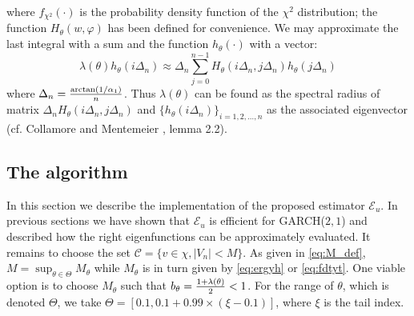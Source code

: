 where $f_{\chi^2}(\cdot)$ is the probability density function of the
$\chi^2$ distribution; the function $H_\theta(w, \varphi)$ has been defined
for convenience.
We may approximate the last integral with a sum and the function
$h_\theta(\cdot)$ with a vector:
\[
\lambda(\theta) h_\theta(i \Delta_n)
\approx
\Delta_n \sum_{j=0}^{n-1} H_\theta(i \Delta_n, j \Delta_n) h_\theta(j \Delta_n)
\]
where $\Delta_n = {\arctan(1/\alpha_1) \over n}$.
Thus $\lambda(\theta)$ can be found as the spectral radius of 
matrix $\Delta_n H_\theta(i \Delta_n, j \Delta_n)$ and 
$\{h_\theta(i \Delta_n)\}_ {i=1,2,\dots, n}$ as the associated
eigenvector (cf. Collamore and Mentemeier
\cite{collamore:mentemeier:2016}, lemma 2.2).

\subsection{The algorithm} \label{sec:main_algorithm}
In this section we describe the implementation of the proposed
estimator $\mathcal E_u$. In previous sections we have shown that
$\mathcal E_u$ is efficient for  GARCH($2, 1$) and described how the
right eigenfunctions can be approximately evaluated. It remains to
choose the set $\mathcal C = \{v \in \chi, |V_n| < M\}$. As given in
\eqref{eq:M_def}, $M = \sup_{\theta \in \Theta} M_{\theta}$ while
$M_\theta$ is in turn given by \eqref{eq:ergyh} or \eqref{eq:fdtyt}.
One viable option is to choose $M_\theta$ such that
$b_\theta = {1 + \lambda(\theta) \over 2} < 1$. For the range of
$\theta$, which is denoted $\Theta$, we take
$\Theta = [0.1, 0.1 + 0.99 \times (\xi - 0.1)]$, where $\xi$ is the
tail index.

